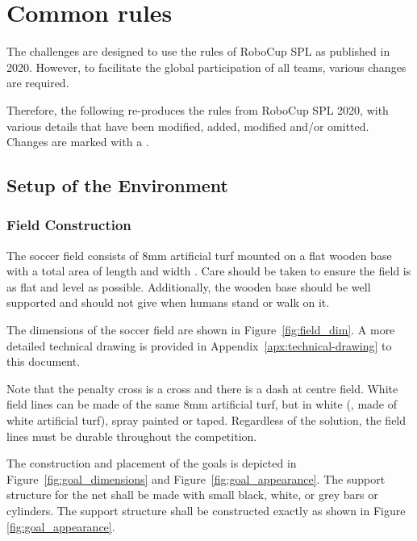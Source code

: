 \section{Common rules}
\label{sec:Common_rules}
The challenges are designed to use the rules of RoboCup SPL as published in 2020. However, to facilitate the global participation of all teams, various changes are required.

Therefore, the following re-produces the rules from RoboCup SPL 2020, with various details that have been modified, added, modified and/or omitted. Changes are marked with a .

\subsection{Setup of the Environment}
\label{sec:environment_setup}
\subsubsection{Field Construction}
\label{sec:field_dim}

The  soccer field consists of 8mm artificial turf mounted on a flat wooden base with a total area of length \TotalLength and width \TotalWidth.  Care should be taken to ensure the field is as flat and level as possible.  Additionally, the wooden base should be well supported and should not give when humans stand or walk on it.


The  dimensions of the soccer field are shown in Figure~\ref{fig:field_dim}.
A more detailed technical drawing is provided in Appendix~\ref{apx:technical-drawing} to this document.
 
Note that the penalty cross is a cross and there is a dash at centre field. White field lines can be made of the same 8mm artificial turf, but in white (\ie, made of white artificial turf), spray painted or taped. Regardless of the solution, the field lines must be durable throughout the competition.

The construction and placement of the goals is depicted in Figure~\ref{fig:goal_dimensions} and Figure~\ref{fig:goal_appearance}. The support structure for the net shall be made with small black, white, or grey bars or cylinders. The support structure shall be constructed exactly as shown in Figure \ref{fig:goal_appearance}.


